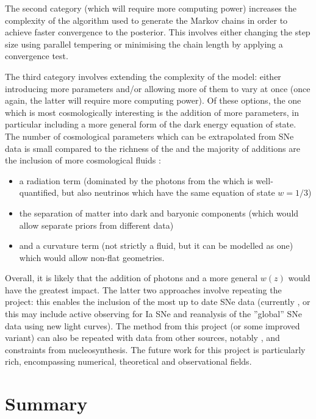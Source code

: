 The second category (which will require more computing power) increases the complexity of the algorithm used to generate the Markov chains in order to achieve faster convergence to the posterior. This involves either changing the step size using parallel tempering or minimising the chain length by applying a convergence test.

The third category involves extending the complexity of the model: either introducing more parameters and/or allowing more of them to vary at once (once again, the latter will require more computing power). Of these options, the one which is most cosmologically interesting is the addition of more parameters, in particular including a more general form of the dark energy equation of state. The number of cosmological parameters which can be extrapolated from SNe data is small compared to the richness of the \cmb{} \cite{Francis2008} and the majority of additions are the inclusion of more cosmological fluids \cite{Hobson2006}:
\begin{itemize}
    \item a radiation term (dominated by the photons from the \cmb{} which is well-quantified, but also neutrinos which have the same equation of state $w = 1/3$)
    \item the separation of matter into dark and baryonic components (which would allow separate priors from different data)
    \item and a curvature term (not strictly a fluid, but it can be modelled as one) which would allow non-flat geometries.
\end{itemize}
Overall, it is likely that the addition of \cmb{} photons and a more general $w(z)$ would have the greatest impact. The latter two approaches involve repeating the project: this enables the inclusion of the most up to date SNe data (currently \cite{Amanullah2010}, or this may include active observing for Ia SNe and reanalysis of the ”global” SNe data using new light curves). The method from this project (or some improved variant) can also be repeated with data from other sources, notably \cmb{}, \bao{} and constraints from nucleosynthesis. The future work for this project is particularly rich, encompassing numerical, theoretical and observational fields.

\section{Summary}
\label{sec:6.2}


